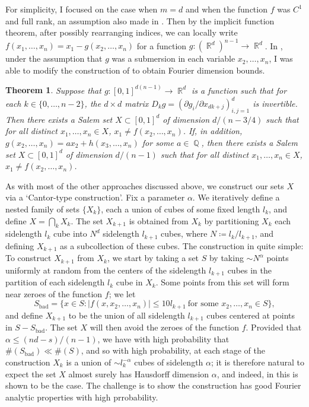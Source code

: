 \documentclass[11pt]{article}
\newtheorem*{theorem}{Theorem}
\DeclareMathOperator{\QQ}{\mathbb{Q}}
\DeclareMathOperator{\RR}{\mathbb{R}}
\begin{document}
For simplicity, I focused on the case when $m = d$ and when the function $f$ was $C^1$ and full rank, an assumption also made in \cite{FraserPramanik}. Then by the implicit function theorem, after possibly rearranging indices, we can locally write $f(x_1,\dots,x_n) = x_1 - g(x_2,\dots,x_n)$ for a function $g: (\RR^d)^{n-1} \to \RR^d$. In \cite{DensonFourier}, under the assumption that $g$ was a submersion in each variable $x_2,\dots,x_n$, I was able to modify the construction of \cite{FraserPramanik} to obtain Fourier dimension bounds.

\begin{theorem} \cite{DensonFourier}
	Suppose that $g: [0,1]^{d(n-1)} \to \RR^d$ is a function such that for each $k \in \{ 0, \dots, n-2 \}$, the $d \times d$ matrix $D_k g = ( \partial g_i / \partial x_{dk+j} )_{i,j = 1}^d$ is invertible. Then there exists a Salem set $X \subset [0,1]^d$ of dimension $d/(n-3/4)$ such that for all distinct $x_1,\dots,x_n \in X$, $x_1 \neq f(x_2,\dots,x_n)$. If, in addition, $g(x_2,\dots,x_n) = ax_2 + h(x_3,\dots,x_n)$ for some $a \in \QQ$, then there exists a Salem set $X \subset [0,1]^d$ of dimension $d/(n-1)$ such that for all distinct $x_1,\dots,x_n \in X$, $x_1 \neq f(x_2,\dots,x_n)$.
\end{theorem}

As with most of the other approaches discussed above, we construct our sets $X$ via a `Cantor-type construction'. Fix a parameter $\alpha$. We iteratively define a nested family of sets $\{ X_k \}$, each a union of cubes of some fixed length $l_k$, and define $X = \bigcap_k X_k$. The set $X_{k+1}$ is obtained from $X_k$ by partitioning $X_k$ each sidelength $l_k$ cube into $N^d$ sidelength $l_{k+1}$ cubes, where $N \coloneqq l_k / l_{k+1}$, and defining $X_{k+1}$ as a subcollection of these cubes. The construction in \cite{DensonFourier} quite simple: To construct $X_{k+1}$ from $X_k$, we start by taking a set $S$ by taking $\sim N^\alpha$ points uniformly at random from the centers of the sidelength $l_{k+1}$ cubes in the partition of each sidelength $l_k$ cube in $X_k$. Some points from this set will form near zeroes of the function $f$; we let
%
\[ S_{\text{bad}} = \{ x \in S : |f(x,x_2,\dots,x_n)| \leq 10 l_{k+1}\ \text{for some $x_2,\dots,x_n \in S$} \}, \]
%
and define $X_{k+1}$ to be the union of all sidelength $l_{k+1}$ cubes centered at points in $S - S_{\text{bad}}$. The set $X$ will then avoid the zeroes of the function $f$. Provided that $\alpha \leq (nd - s)/(n-1)$, we have with high probability that $\#(S_{\text{bad}}) \ll \#(S)$, and so with high probability, at each stage of the construction $X_k$ is a union of $\sim l_k^{-\alpha}$ cubes of sidelength $\alpha$; it is therefore natural to expect the set $X$ almost surely has Hausdorff dimension $\alpha$, and indeed, in \cite{DensonPramanikZahl} this is shown to be the case. The challenge is to show the construction has good Fourier analytic properties with high prrobability.
\end{document}
